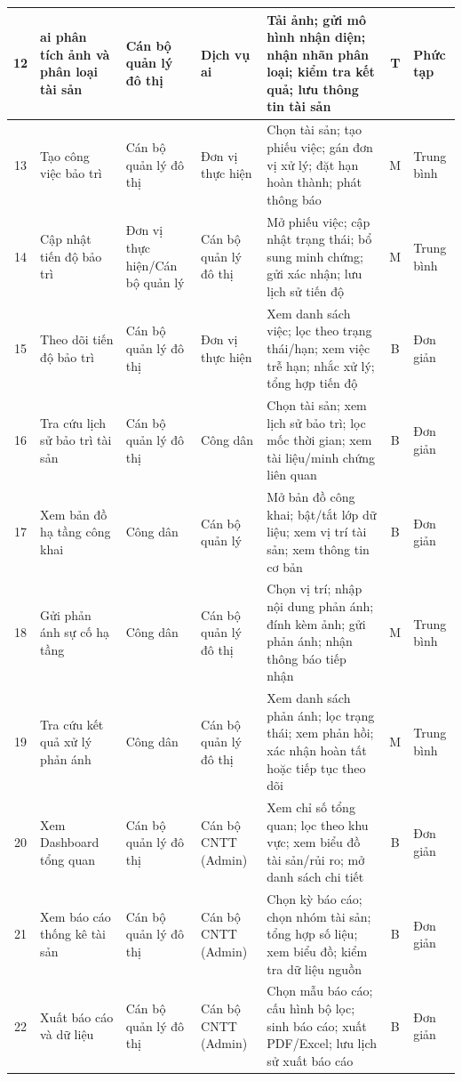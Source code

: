 \begin{longtable}{|c|p{3.2cm}|p{2.0cm}|p{2.0cm}|p{4.8cm}|c|p{1.5cm}|}
    12 & \gls{ai} phân tích ảnh và phân loại tài sản & Cán bộ quản lý đô thị & Dịch vụ \gls{ai} & Tải ảnh; gửi mô hình nhận diện; nhận nhãn phân loại; kiểm tra kết quả; lưu thông tin tài sản & T & Phức tạp \\ \hline
    13 & Tạo công việc bảo trì & Cán bộ quản lý đô thị & Đơn vị thực hiện & Chọn tài sản; tạo phiếu việc; gán đơn vị xử lý; đặt hạn hoàn thành; phát thông báo & M & Trung bình \\ \hline
    14 & Cập nhật tiến độ bảo trì & Đơn vị thực hiện/Cán bộ quản lý & Cán bộ quản lý đô thị & Mở phiếu việc; cập nhật trạng thái; bổ sung minh chứng; gửi xác nhận; lưu lịch sử tiến độ & M & Trung bình \\ \hline
    15 & Theo dõi tiến độ bảo trì & Cán bộ quản lý đô thị & Đơn vị thực hiện & Xem danh sách việc; lọc theo trạng thái/hạn; xem việc trễ hạn; nhắc xử lý; tổng hợp tiến độ & B & Đơn giản \\ \hline
    16 & Tra cứu lịch sử bảo trì tài sản & Cán bộ quản lý đô thị & Công dân & Chọn tài sản; xem lịch sử bảo trì; lọc mốc thời gian; xem tài liệu/minh chứng liên quan & B & Đơn giản \\ \hline
    17 & Xem bản đồ hạ tầng công khai & Công dân & Cán bộ quản lý & Mở bản đồ công khai; bật/tắt lớp dữ liệu; xem vị trí tài sản; xem thông tin cơ bản & B & Đơn giản \\ \hline
    18 & Gửi phản ánh sự cố hạ tầng & Công dân & Cán bộ quản lý đô thị & Chọn vị trí; nhập nội dung phản ánh; đính kèm ảnh; gửi phản ánh; nhận thông báo tiếp nhận & M & Trung bình \\ \hline
    19 & Tra cứu kết quả xử lý phản ánh & Công dân & Cán bộ quản lý đô thị & Xem danh sách phản ánh; lọc trạng thái; xem phản hồi; xác nhận hoàn tất hoặc tiếp tục theo dõi & M & Trung bình \\ \hline
    20 & Xem Dashboard tổng quan & Cán bộ quản lý đô thị & Cán bộ CNTT (Admin) & Xem chỉ số tổng quan; lọc theo khu vực; xem biểu đồ tài sản/rủi ro; mở danh sách chi tiết & B & Đơn giản \\ \hline
    21 & Xem báo cáo thống kê tài sản & Cán bộ quản lý đô thị & Cán bộ CNTT (Admin) & Chọn kỳ báo cáo; chọn nhóm tài sản; tổng hợp số liệu; xem biểu đồ; kiểm tra dữ liệu nguồn & B & Đơn giản \\ \hline
    22 & Xuất báo cáo và dữ liệu & Cán bộ quản lý đô thị & Cán bộ CNTT (Admin) & Chọn mẫu báo cáo; cấu hình bộ lọc; sinh báo cáo; xuất PDF/Excel; lưu lịch sử xuất báo cáo & B & Đơn giản \\ \hline
\end{longtable}
